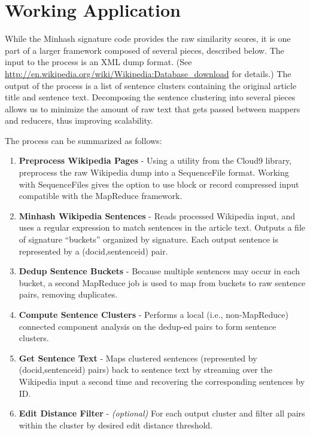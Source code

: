 \documentclass{acm_proc_article-sp}
\begin{document}
\section{Working Application}

While the Minhash signature code provides the raw similarity scores, it is one part of a larger framework composed of several pieces, described below. The input to the process is an XML dump format. (See \url{http://en.wikipedia.org/wiki/Wikipedia:Database_download} for details.) The output of the process is a list of sentence clusters containing the original article title and sentence text. Decomposing the sentence clustering into several pieces allows us to minimize the amount of raw text that gets passed between mappers and reducers, thus improving scalability.

The process can be summarized as follows:

\begin{enumerate}
\item \textbf{Preprocess Wikipedia Pages} - Using a utility from the Cloud9 library, preprocess the raw Wikipedia dump into a SequenceFile format. Working with SequenceFiles gives the option to use block or record compressed input compatible with the MapReduce framework.
\item \textbf{Minhash Wikipedia Sentences} - Reads processed Wikipedia input, and uses a regular expression to match sentences in the article text. Outputs a file of signature ``buckets'' organized by signature. Each output sentence is represented by a (docid,sentenceid) pair.
\item \textbf{Dedup Sentence Buckets} - Because multiple sentences may occur in each bucket, a second MapReduce job is used to map from buckets to raw sentence pairs, removing duplicates.
\item \textbf{Compute Sentence Clusters} - Performs a local (i.e., non-MapReduce) connected component analysis on the dedup-ed pairs to form sentence clusters.
\item \textbf{Get Sentence Text} - Maps clustered sentences (represented by (docid,sentenceid) pairs) back to sentence text by streaming over the Wikipedia input a second time and recovering the corresponding sentences by ID.
\item \textbf{Edit Distance Filter} - \emph{(optional)} For each output cluster and filter all pairs within the cluster by desired edit distance threshold.
\end{enumerate}
\end{document}
